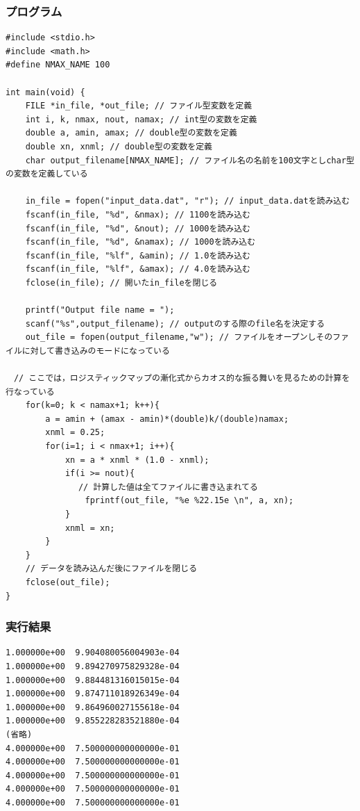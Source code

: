 \documentclass{jarticle}
\begin{document}
\subsubsection{プログラム\\}
\begin{breakbox}
\begin{verbatim}
#include <stdio.h>
#include <math.h>
#define NMAX_NAME 100

int main(void) {
    FILE *in_file, *out_file; // ファイル型変数を定義
    int i, k, nmax, nout, namax; // int型の変数を定義
    double a, amin, amax; // double型の変数を定義
    double xn, xnml; // double型の変数を定義
    char output_filename[NMAX_NAME]; // ファイル名の名前を100文字としchar型の変数を定義している

    in_file = fopen("input_data.dat", "r"); // input_data.datを読み込む
    fscanf(in_file, "%d", &nmax); // 1100を読み込む
    fscanf(in_file, "%d", &nout); // 1000を読み込む
    fscanf(in_file, "%d", &namax); // 1000を読み込む
    fscanf(in_file, "%lf", &amin); // 1.0を読み込む
    fscanf(in_file, "%lf", &amax); // 4.0を読み込む
    fclose(in_file); // 開いたin_fileを閉じる

    printf("Output file name = ");
    scanf("%s",output_filename); // outputのする際のfile名を決定する
    out_file = fopen(output_filename,"w"); // ファイルをオープンしそのファイルに対して書き込みのモードになっている
    
　// ここでは，ロジスティックマップの漸化式からカオス的な振る舞いを見るための計算を行なっている
    for(k=0; k < namax+1; k++){
        a = amin + (amax - amin)*(double)k/(double)namax;
        xnml = 0.25;
        for(i=1; i < nmax+1; i++){
            xn = a * xnml * (1.0 - xnml);
            if(i >= nout){
            　 // 計算した値は全てファイルに書き込まれてる
                fprintf(out_file, "%e %22.15e \n", a, xn);
            }
            xnml = xn;
        }
    }
    // データを読み込んだ後にファイルを閉じる
    fclose(out_file);
}
\end{verbatim}
\end{breakbox}
\subsubsection{実行結果\\}
\begin{breakbox}
\begin{verbatim}
1.000000e+00  9.904080056004903e-04 
1.000000e+00  9.894270975829328e-04 
1.000000e+00  9.884481316015015e-04 
1.000000e+00  9.874711018926349e-04 
1.000000e+00  9.864960027155618e-04 
1.000000e+00  9.855228283521880e-04 
(省略)
4.000000e+00  7.500000000000000e-01 
4.000000e+00  7.500000000000000e-01 
4.000000e+00  7.500000000000000e-01 
4.000000e+00  7.500000000000000e-01 
4.000000e+00  7.500000000000000e-01 
\end{verbatim}
\end{breakbox}
\end{document}
